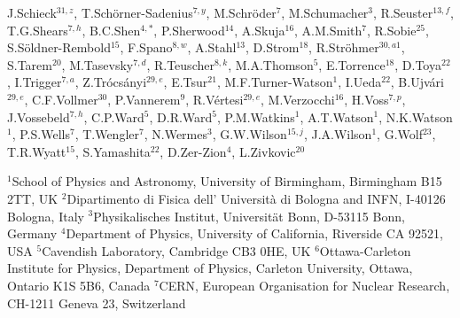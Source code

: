 {\begin{center}
{J.\thinspace Schieck$^{ 31, z}$,
T.\thinspace Sch\"orner-Sadenius$^{  7, y}$,
M.\thinspace Schr\"oder$^{  7}$,
M.\thinspace Schumacher$^{  3}$,
R.\thinspace Seuster$^{ 13,  f}$,
T.G.\thinspace Shears$^{  7,  h}$,
B.C.\thinspace Shen$^{  4, *}$,
P.\thinspace Sherwood$^{ 14}$,
A.\thinspace Skuja$^{ 16}$,
A.M.\thinspace Smith$^{  7}$,
R.\thinspace Sobie$^{ 25}$,
S.\thinspace S\"oldner-Rembold$^{ 15}$,
F.\thinspace Spano$^{  8,   w}$,
A.\thinspace Stahl$^{ 13}$,
D.\thinspace Strom$^{ 18}$,
R.\thinspace Str\"ohmer$^{ 30, a1}$,
S.\thinspace Tarem$^{ 20}$,
M.\thinspace Tasevsky$^{  7,  d}$,
R.\thinspace Teuscher$^{  8, k}$,
M.A.\thinspace Thomson$^{  5}$,
E.\thinspace Torrence$^{ 18}$,
D.\thinspace Toya$^{ 22}$,
I.\thinspace Trigger$^{  7,  a}$,
Z.\thinspace Tr\'ocs\'anyi$^{ 29,  e}$,
E.\thinspace Tsur$^{ 21}$,
M.F.\thinspace Turner-Watson$^{  1}$,
I.\thinspace Ueda$^{ 22}$,
B.\thinspace Ujv\'ari$^{ 29,  e}$,
C.F.\thinspace Vollmer$^{ 30}$,
P.\thinspace Vannerem$^{  9}$,
R.\thinspace V\'ertesi$^{ 29, e}$,
M.\thinspace Verzocchi$^{ 16}$,
H.\thinspace Voss$^{  7,  p}$,
J.\thinspace Vossebeld$^{  7,   h}$,
C.P.\thinspace Ward$^{  5}$,
D.R.\thinspace Ward$^{  5}$,
P.M.\thinspace Watkins$^{  1}$,
A.T.\thinspace Watson$^{  1}$,
N.K.\thinspace Watson$^{  1}$,
P.S.\thinspace Wells$^{  7}$,
T.\thinspace Wengler$^{  7}$,
N.\thinspace Wermes$^{  3}$,
G.W.\thinspace Wilson$^{ 15,  j}$,
J.A.\thinspace Wilson$^{  1}$,
G.\thinspace Wolf$^{ 23}$,
T.R.\thinspace Wyatt$^{ 15}$,
S.\thinspace Yamashita$^{ 22}$,
D.\thinspace Zer-Zion$^{  4}$,
L.\thinspace Zivkovic$^{ 20}$
}\end{center}\bigskip
\bigskip
$^{  1}$School of Physics and Astronomy, University of Birmingham,
Birmingham B15 2TT, UK
\newline
$^{  2}$Dipartimento di Fisica dell' Universit\`a di Bologna and INFN,
I-40126 Bologna, Italy
\newline
$^{  3}$Physikalisches Institut, Universit\"at Bonn,
D-53115 Bonn, Germany
\newline
$^{  4}$Department of Physics, University of California,
Riverside CA 92521, USA
\newline
$^{  5}$Cavendish Laboratory, Cambridge CB3 0HE, UK
\newline
$^{  6}$Ottawa-Carleton Institute for Physics,
Department of Physics, Carleton University,
Ottawa, Ontario K1S 5B6, Canada
\newline
$^{  7}$CERN, European Organisation for Nuclear Research,
CH-1211 Geneva 23, Switzerland
}
